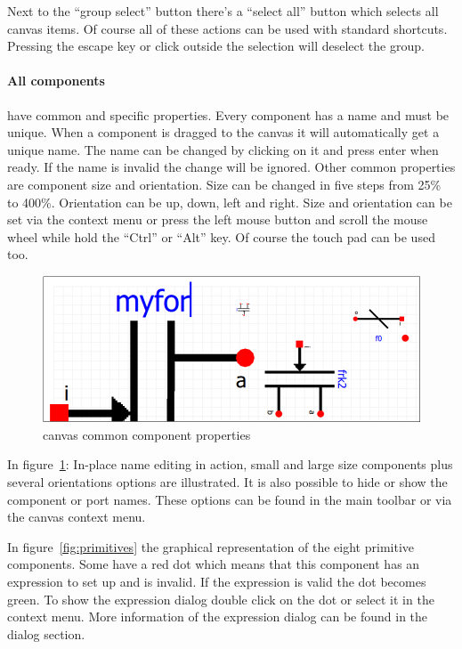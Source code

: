 Next to the ``group select'' button there's a ``select all'' button which selects all
canvas items. Of course all of these actions can be used with standard
shortcuts. Pressing the escape key or click outside the selection will deselect the group.

\paragraph{All components}have common and specific properties. Every component
has a name and must be unique. When a component is dragged to the canvas it will
automatically get a unique name. The name can be changed by clicking on it and
press enter when ready. If the name is invalid the change will be ignored. Other
common properties are component size and orientation. Size can be changed in
five steps from 25\% to 400\%. Orientation can be up, down, left and right. Size
and orientation can be set via the context menu or press the left mouse button
and scroll the mouse wheel while hold the ``Ctrl'' or ``Alt'' key. Of course the
touch pad can be used too.

\begin{figure}[here]
\begin{center}	
	\includegraphics[width=.70\linewidth]{pictures/component-common-properties}
	\caption{canvas common component properties}
	\label{fig:component-common-properties}
\end{center}
\end{figure}

In figure~\ref{fig:component-common-properties}: In-place name editing in
action, small and large size components plus several orientations options are
illustrated. It is also possible to hide or show the component or port names.
These options can be found in the main toolbar or via the canvas context menu.



In figure~\ref{fig:primitives} the graphical representation of the eight
primitive components. Some have a red dot which means that this component has an
expression to set up and is invalid. If the expression is valid the dot becomes
green. To show the expression dialog double click on the dot or select it in the
context menu. More information of the expression dialog can be found in the
dialog section.

